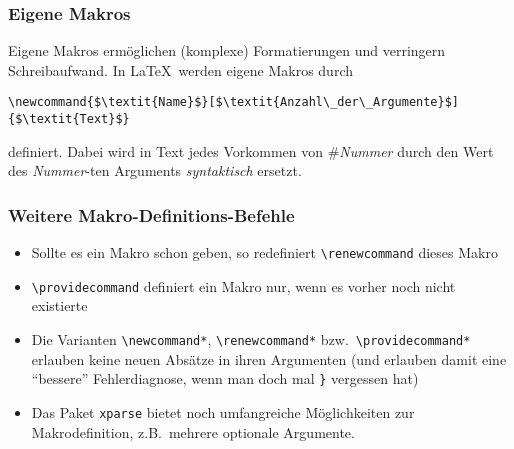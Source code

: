 \begin{frame}[fragile]
  \frametitle{Eigene Makros}
  \onslide<+->

  Eigene Makros ermöglichen (komplexe) Formatierungen und verringern Schreibaufwand.  In
  \LaTeX\ werden eigene Makros durch
\begin{lstlisting}
\newcommand{$\textit{Name}$}[$\textit{Anzahl\_der\_Argumente}$]{$\textit{Text}$}
\end{lstlisting}
  definiert. Dabei wird in Text jedes Vorkommen von \#\emph{Nummer} durch den Wert des
  \emph{Nummer}-ten Arguments \emph{syntaktisch} ersetzt.
\end{frame}

\begin{frame}[fragile]
  \frametitle{Weitere Makro-Definitions-Befehle}


  \begin{itemize}[<+->]
  \item Sollte es ein Makro schon geben, so redefiniert \lstinline!\renewcommand!
    dieses Makro
  \item \lstinline!\providecommand! definiert ein Makro nur, wenn es vorher noch nicht
    existierte
  \item Die Varianten \lstinline!\newcommand*!, \lstinline!\renewcommand*! bzw.\,
    \lstinline!\providecommand*! erlauben keine neuen Absätze in ihren Argumenten (und
    erlauben damit eine \enquote{bessere} Fehlerdiagnose, wenn man doch mal
    \texttt{\}} vergessen hat)
  \item Das Paket \texttt{xparse} bietet noch umfangreiche Möglichkeiten zur
    Makrodefinition, z.B.\ mehrere optionale Argumente.
  \end{itemize}
\end{frame}





